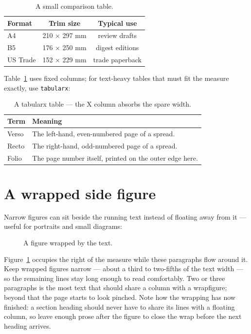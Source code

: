 \begin{table}[ht]
  \centering
  \caption{A small comparison table.}
  \label{tab:compare}
  \begin{tabular}{lcc}
    \toprule
    Format & Trim size & Typical use\\
    \midrule
    A4       & 210 × 297 mm & review drafts\\
    B5       & 176 × 250 mm & digest editions\\
    US Trade & 152 × 229 mm & trade paperback\\
    \bottomrule
  \end{tabular}
\end{table}

Table~\ref{tab:compare} uses fixed columns; for text-heavy tables
that must fit the measure exactly, use \texttt{tabularx}:

\begin{table}[ht]
  \centering
  \caption{A tabularx table — the X column absorbs the spare width.}
  \label{tab:x}
  \begin{tabularx}{\linewidth}{lX}
    \toprule
    Term & Meaning\\
    \midrule
    Verso & The left-hand, even-numbered page of a spread.\\
    Recto & The right-hand, odd-numbered page of a spread.\\
    Folio & The page number itself, printed on the outer edge here.\\
    \bottomrule
  \end{tabularx}
\end{table}

\section{A wrapped side figure}
Narrow figures can sit beside the running text instead of floating
away from it --- useful for portraits and small diagrams:

\begin{figure}
  \centering
  \caption{A figure wrapped by the text.}
  \label{fig:wrap}
\end{figure}

Figure~\ref{fig:wrap} occupies the right of the measure while these
paragraphs flow around it. Keep wrapped figures narrow --- about a
third to two-fifths of the text width --- so the remaining lines stay
long enough to read comfortably. Two or three paragraphs is the most
text that should share a column with a wrapfigure; beyond that the
page starts to look pinched. Note how the wrapping has now finished:
a section heading should never have to share its lines with a
floating column, so leave enough prose after the figure to close the
wrap before the next heading arrives.

